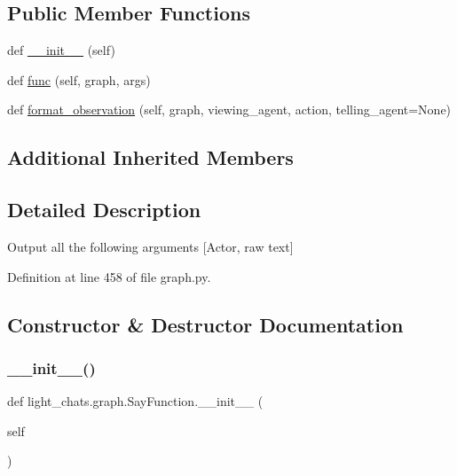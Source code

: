 \subsection*{Public Member Functions}
\begin{DoxyCompactItemize}
\item 
def \hyperlink{classlight__chats_1_1graph_1_1SayFunction_a2d42dde7366558243d4282cab89e9184}{\+\_\+\+\_\+init\+\_\+\+\_\+} (self)
\item 
def \hyperlink{classlight__chats_1_1graph_1_1SayFunction_af14fb1e5a036d9c537ea2915f2c76275}{func} (self, graph, args)
\item 
def \hyperlink{classlight__chats_1_1graph_1_1SayFunction_a20e5908183144f719a93276707938894}{format\+\_\+observation} (self, graph, viewing\+\_\+agent, action, telling\+\_\+agent=None)
\end{DoxyCompactItemize}
\subsection*{Additional Inherited Members}


\subsection{Detailed Description}
\begin{DoxyVerb}Output all the following arguments [Actor, raw text]\end{DoxyVerb}
 

Definition at line 458 of file graph.\+py.



\subsection{Constructor \& Destructor Documentation}
\mbox{\label{classlight__chats_1_1graph_1_1SayFunction_a2d42dde7366558243d4282cab89e9184}} 
\subsubsection{\texorpdfstring{\+\_\+\+\_\+init\+\_\+\+\_\+()}{\_\_init\_\_()}}
{\footnotesize\ttfamily def light\+\_\+chats.\+graph.\+Say\+Function.\+\_\+\+\_\+init\+\_\+\+\_\+ (\begin{DoxyParamCaption}\item[{}]{self }\end{DoxyParamCaption})}



